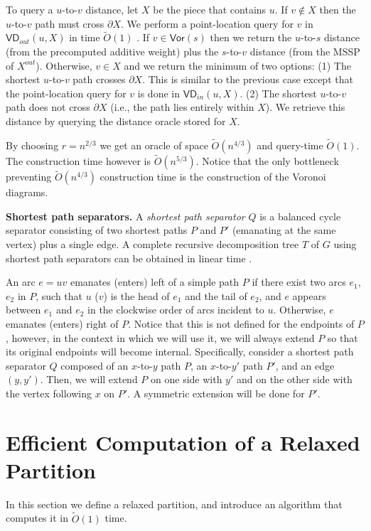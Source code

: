 \documentclass{article}
\newcommand{\Vor}{\textsf{Vor}}
\newcommand{\out}[1]{#1^{out}}
\newcommand{\VDin}{\textsf{VD}_{in}}
\newcommand{\VDout}{\textsf{VD}_{out}}
\newcommand{\X}{X}
\newcommand{\Otild}{\tilde{O}}
\begin{document}
To query a $u$-to-$v$ distance, let $\X$ be the piece that contains $u$.
If $v \not\in \X$ then the $u$-to-$v$ path must cross $\partial \X$.
We perform a point-location query for $v$ in  $\VDout(u,\X)$ in time $\tilde O(1)$ \cite{GawrychowskiMWW18}.
If $v\in \Vor(s)$ then we return the $u$-to-$s$ distance (from the precomputed additive weight) plus the $s$-to-$v$ distance (from the MSSP of $\out{\X}$).
Otherwise, $v \in \X$ and we return the minimum of two options: (1) The shortest $u$-to-$v$ path crosses $\partial \X$.
This is similar to the previous case except that the point-location query for $v$ is done in $\VDin(u,\X)$.
(2)
The shortest $u$-to-$v$ path does not cross $\partial \X$ (i.e., the path lies entirely within $\X$).
We  retrieve this distance by querying the distance oracle stored for $\X$.

By choosing $r=n^{2/3}$ we get an oracle of space $\tilde O(n^{4/3})$ and query-time $\tilde O(1)$.
The construction time however is $\tilde O(n^{5/3})$.
Notice that the only bottleneck preventing $\tilde O(n^{4/3})$ construction time is the construction of the Voronoi diagrams.

\medskip
\noindent
{\bf Shortest path separators.}
A {\em shortest path separator} $Q$ is a balanced cycle separator consisting of two shortest paths $P$ and $P'$ (emanating at the same vertex) plus a single edge.
A complete recursive decomposition tree $T$ of $G$ using shortest path separators can be obtained in linear time \cite{LT79}.

An arc $e=uv$ emanates (enters) left of a simple path $P$ if there exist two arcs $e_1$, $e_2$ in $P$, such that $u$ ($v$) is the head of $e_1$ and the tail of $e_2$, and $e$ appears between $e_1$ and $e_2$ in the clockwise order of arcs incident to $u$.
Otherwise, $e$  emanates (enters) right of $P$.
Notice that this is not defined for the endpoints of $P$, however, in the context in which we will use it, we will always extend $P$ so that its original endpoints will become internal.
Specifically, consider a shortest path separator $Q$ composed of an $x$-to-$y$ path $P$, an $x$-to-$y'$ path $P'$, and an edge $(y,y')$.
Then, we will extend $P$ on one side with $y'$ and on the other side with the vertex following $x$ on $P'$.
A symmetric extension will be done for $P'$.


\section{Efficient Computation of a Relaxed Partition}\label{sec:relaxed-partition}
In this section we define a relaxed partition, and introduce an algorithm that computes it in $\Otild(1)$ time.
\end{document}
